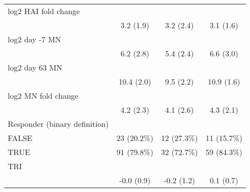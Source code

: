 \begin{table}[]
\begin{tabular}{ l c c c }
 log2 HAI fold change  &   &   &  \\ 
 \hspace{6pt}   & 3.2 (1.9) & 3.2 (2.4) & 3.1 (1.6)\\ 
 log2 day -7 MN  &   &   &  \\ 
 \hspace{6pt}   & 6.2 (2.8) & 5.4 (2.4) & 6.6 (3.0)\\ 
 log2 day 63 MN  &   &   &  \\ 
 \hspace{6pt}   & 10.4 (2.0) & 9.5 (2.2) & 10.9 (1.6)\\ 
 log2 MN fold change  &   &   &  \\ 
 \hspace{6pt}   & 4.2 (2.3) & 4.1 (2.6) & 4.3 (2.1)\\ 
 Responder (binary definition) &   &   &  \\ 
 \hspace{6pt}    FALSE & 23 (20.2\%) & 12 (27.3\%) & 11 (15.7\%)\\ 
 \hspace{6pt}    TRUE & 91 (79.8\%) & 32 (72.7\%) & 59 (84.3\%)\\ 
 TRI &   &   &  \\ 
 \hspace{6pt}   & -0.0 (0.9) & -0.2 (1.2) & 0.1 (0.7)\\ 
 \bottomrule
 
 \end{tabular}
 \end{table}
